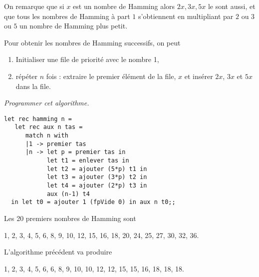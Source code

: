 On remarque que si $x$ est un nombre de {\sc Hamming} alors $2x,3x,5x$ le sont aussi, et que tous les nombres de {\sc Hamming} à part $1$ s'obtiennent en multipliant par $2$ ou $3$ ou $5$ un nombre de {\sc Hamming} plus petit.

Pour obtenir les nombres de Hamming successifs, on peut
\begin{enumerate}
\item Initialiser une file de priorité avec le nombre 1, 
\item répéter $n$ fois :
extraire le premier élément de la file, $x$ et insérer $2x$, $3x$ et $5x$ dans la file.
\end{enumerate}
\begin{Exercise}[title = Une première tentative]\it 
Programmer cet algorithme.
\end{Exercise}
\begin{Answer}
\begin{lstlisting}
let rec hamming n =
   let rec aux n tas =
      match n with
      |1 -> premier tas
      |n -> let p = premier tas in
            let t1 = enlever tas in
            let t2 = ajouter (5*p) t1 in
            let t3 = ajouter (3*p) t2 in
            let t4 = ajouter (2*p) t3 in
            aux (n-1) t4
  in let t0 = ajouter 1 (fpVide 0) in aux n t0;;
\end{lstlisting}
\end{Answer}
\bigskip

Les 20 premiers nombres de Hamming sont 

1, 2, 3, 4, 5, 6, 8, 9, 10, 12, 15, 16, 18, 20, 24, 25, 27, 30, 32, 36.

L'algorithme précédent va produire 

1, 2, 3, 4, 5, 6, 6, 8, 9, 10, 10, 12, 12, 15, 15, 16, 18, 18, 18.

